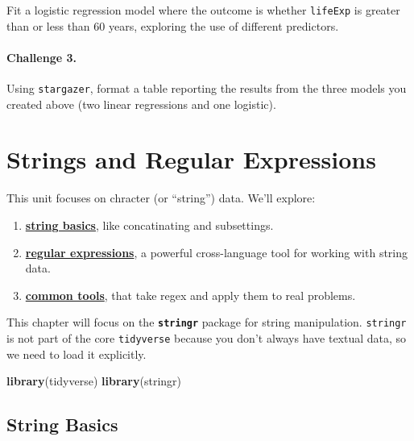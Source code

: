\documentclass[]{book}
\newenvironment{Shaded}{\begin{snugshade}}{\end{snugshade}}
\newcommand{\KeywordTok}[1]{\textcolor[rgb]{0.13,0.29,0.53}{\textbf{#1}}}
\newcommand{\NormalTok}[1]{#1}
\providecommand{\tightlist}{%
  \setlength{\itemsep}{0pt}\setlength{\parskip}{0pt}}
\begin{document}
Fit a logistic regression model where the outcome is whether
\texttt{lifeExp} is greater than or less than 60 years, exploring the
use of different predictors.

\subsubsection*{Challenge 3.}\label{challenge-3.-7}

Using \texttt{stargazer}, format a table reporting the results from the
three models you created above (two linear regressions and one
logistic).

\chapter{Strings and Regular
Expressions}\label{strings-and-regular-expressions}

This unit focuses on chracter (or ``string'') data. We'll explore:

\begin{enumerate}
\def\labelenumi{\arabic{enumi}.}
\tightlist
\item
  \textbf{\protect\hyperlink{string-basics}{string basics}}, like
  concatinating and subsettings.
\item
  \textbf{\protect\hyperlink{regular-expressions}{regular expressions}},
  a powerful cross-language tool for working with string data.
\item
  \textbf{\protect\hyperlink{common-tools}{common tools}}, that take
  regex and apply them to real problems.
\end{enumerate}

This chapter will focus on the \textbf{\texttt{stringr}} package for
string manipulation. \texttt{stringr} is not part of the core
\texttt{tidyverse} because you don't always have textual data, so we
need to load it explicitly.

\begin{Shaded}
\begin{Highlighting}[]
\KeywordTok{library}\NormalTok{(tidyverse)}
\KeywordTok{library}\NormalTok{(stringr)}
\end{Highlighting}
\end{Shaded}

\hypertarget{string-basics}{\section{String
Basics}\label{string-basics}}
\end{document}
